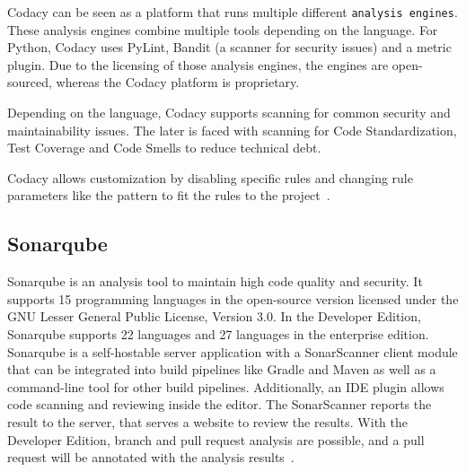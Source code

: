 Codacy can be seen as a platform that runs multiple different \texttt{analysis engines}. These analysis engines combine multiple tools depending on the language. For Python, Codacy uses  PyLint, Bandit (a scanner for security issues) and a metric plugin.
Due to the licensing of those analysis engines, the engines are open-sourced, whereas the Codacy platform is proprietary.

Depending on the language, Codacy supports scanning for common security and maintainability issues. The later is faced with scanning for Code Standardization, Test Coverage and Code Smells to reduce technical debt.

Codacy allows customization by disabling specific rules and changing rule parameters like the pattern to fit the rules to the project~\cite{noauthor_codacy_nodate}. 

\subsection{Sonarqube}
Sonarqube is an analysis tool to maintain high code quality and security. It supports 15 programming languages in the open-source version licensed under the GNU Lesser General Public License, Version 3.0. In the Developer Edition, Sonarqube supports 22 languages and 27 languages in the enterprise edition. Sonarqube is a self-hostable server application with a SonarScanner client module that can be integrated into build pipelines like Gradle and Maven as well as a command-line tool for other build pipelines. Additionally, an IDE plugin allows code scanning and reviewing inside the editor. The SonarScanner reports the result to the server, that serves a website to review the results. With the Developer Edition, branch and pull request analysis are possible, and a pull request will be annotated with the analysis results~\cite{noauthor_code_nodate}.

